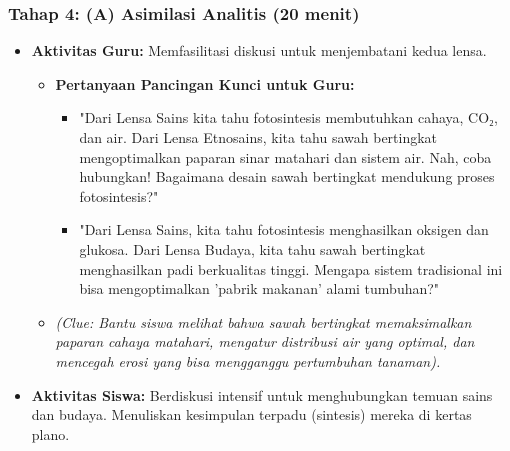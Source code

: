 \documentclass[a4paper,12pt]{article}
\begin{document}
\subsubsection{Tahap 4: (A) Asimilasi Analitis (20 menit)}
\begin{itemize}
\item \textbf{Aktivitas Guru:} Memfasilitasi diskusi untuk menjembatani kedua lensa.
    \begin{itemize}
    \item \textbf{Pertanyaan Pancingan Kunci untuk Guru:}
        \begin{itemize}
        \item "Dari Lensa Sains kita tahu fotosintesis membutuhkan cahaya, CO₂, dan air. Dari Lensa Etnosains, kita tahu sawah bertingkat mengoptimalkan paparan sinar matahari dan sistem air. Nah, coba hubungkan! Bagaimana desain sawah bertingkat mendukung proses fotosintesis?"
        \item "Dari Lensa Sains, kita tahu fotosintesis menghasilkan oksigen dan glukosa. Dari Lensa Budaya, kita tahu sawah bertingkat menghasilkan padi berkualitas tinggi. Mengapa sistem tradisional ini bisa mengoptimalkan 'pabrik makanan' alami tumbuhan?"
        \end{itemize}
    \item \textit{(Clue: Bantu siswa melihat bahwa sawah bertingkat memaksimalkan paparan cahaya matahari, mengatur distribusi air yang optimal, dan mencegah erosi yang bisa mengganggu pertumbuhan tanaman).}
    \end{itemize}
\item \textbf{Aktivitas Siswa:} Berdiskusi intensif untuk menghubungkan temuan sains dan budaya. Menuliskan kesimpulan terpadu (sintesis) mereka di kertas plano.
\end{itemize}
\end{document}

